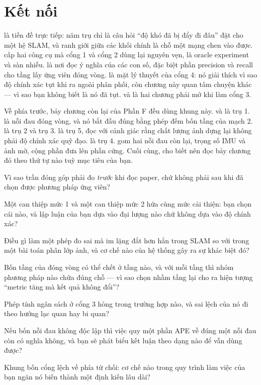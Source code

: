 \documentclass[../../deep_learning.tex]{subfiles}
\begin{document}
\section{Kết nối}
 là tiền đề trực tiếp: năm trụ chỉ là câu hỏi ``độ khó đã bị đẩy đi đâu'' đặt cho một hệ SLAM, và ranh giới giữa các khối chính là chỗ một mạng chen vào được.  cấp hai công cụ mà cổng 1 và cổng 2 dùng lại nguyên vẹn, là oracle experiment và sàn nhiễu.  là nơi đọc ý nghĩa của các con số, đặc biệt phần precision và recall cho tầng lấy ứng viên đóng vòng.  là mặt lý thuyết của cổng 4: nó giải thích vì sao độ chính xác tụt khi ra ngoài phân phối, còn chương này quan tâm chuyện khác --- vì sao bạn không biết là nó đã tụt.  và  là hai chương phải mở khi làm cổng 3.

Về phía trước, bảy chương còn lại của Phần F đều dùng khung này.  và  là trụ 1.  là nỗi đau đóng vòng, và nó bắt đầu đúng bằng phép đếm bốn tầng của mạch 2.  là trụ 2 và trụ 3.  là trụ 5, đọc với cảnh giác rằng chất lượng ảnh dựng lại không phải độ chính xác quỹ đạo.  là trụ 4.  gom hai nỗi đau còn lại, trọng số IMU và ảnh mờ, cộng phần đưa lên phần cứng. Cuối cùng,  cho biết nên đọc bảy chương đó theo thứ tự nào tuỳ mục tiêu của bạn.

\begin{tukiem}
\item Vì sao trần đóng góp phải đo \emph{trước} khi đọc paper, chứ không phải sau khi đã chọn được phương pháp ứng viên?
\item Một can thiệp mức 1 và một can thiệp mức 2 hứa cùng mức cải thiện: bạn chọn cái nào, và lập luận của bạn dựa vào đại lượng nào chứ không dựa vào độ chính xác?
\item Điều gì làm một phép đo sai mà im lặng đắt hơn hẳn trong SLAM so với trong một bài toán phân lớp ảnh, và cơ chế nào của hệ thống gây ra sự khác biệt đó?
\item Bốn tầng của đóng vòng có thể chết ở tầng nào, và với mỗi tầng thì nhóm phương pháp nào chữa đúng chỗ --- vì sao chọn nhầm tầng lại cho ra hiện tượng ``metric tăng mà kết quả không đổi''?
\item Phép tính ngân sách ở cổng 3 hỏng trong trường hợp nào, và sai lệch của nó đi theo hướng lạc quan hay bi quan?
\item Nếu bốn nỗi đau không độc lập thì việc quy một phần APE về đúng một nỗi đau còn có nghĩa không, và bạn sẽ phát biểu kết luận theo dạng nào để vẫn dùng được?
\item Khung bốn cổng lệch về phía từ chối: cơ chế nào trong quy trình làm việc của bạn ngăn nó biến thành một định kiến lâu dài?
\end{tukiem}
\ifSubfilesClassLoaded{\printbibliography[title={Nguồn}]}{}
\end{document}
